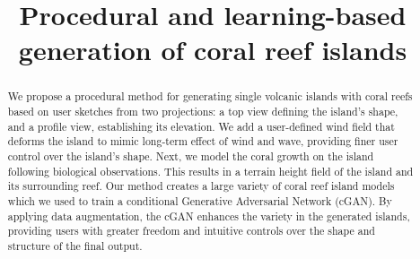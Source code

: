 \documentclass[final,5p,times,twocolumn]{elsarticle}
\begin{document}
\begin{frontmatter}
    


\title{Procedural and learning-based generation of coral reef islands}


\author{} %


\begin{abstract}
We propose a procedural method for generating single volcanic islands with coral reefs based on user sketches from two projections: a top view defining the island's shape, and a profile view, establishing its elevation. 
We add a user-defined wind field that deforms the island to mimic long-term effect of wind and wave, providing finer user control over the island's shape.
Next, we model the coral growth on the island following biological observations.
This results in a terrain height field of the island and its surrounding reef. 
Our method creates a large variety of coral reef island models which we used to train a conditional Generative Adversarial Network (cGAN). 
By applying data augmentation, the cGAN enhances the variety in the generated islands, providing users with greater freedom and intuitive controls over the shape and structure of the final output.
\end{abstract}


\end{frontmatter}
\end{document}
